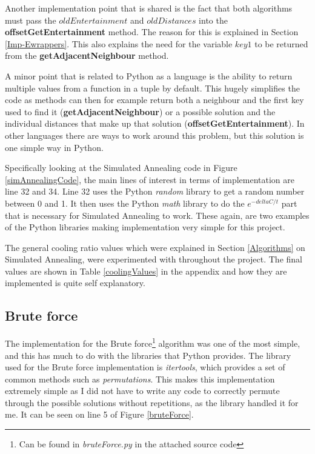 \documentclass[12pt]{report}
\begin{document}
Another implementation point that is shared is the fact that both algorithms must pass the $oldEntertainment$ and $oldDistances$ into the \textbf{offsetGetEntertainment} method. The reason for this is explained in Section \ref{Imp-Ewrappers}. This also explains the need for the variable $key1$ to be returned from the \textbf{getAdjacentNeighbour} method. 

A minor point that is related to Python as a language is the ability to return multiple values from a function in a tuple by default. This hugely simplifies the code as methods can then for example return both a neighbour and the first key used to find it (\textbf{getAdjacentNeighbour}) or a possible solution and the individual distances that make up that solution (\textbf{offsetGetEntertainment}). In other languages there are ways to work around this problem, but this solution is one simple way in Python.

Specifically looking at the Simulated Annealing code in Figure \ref{simAnnealingCode}, the main lines of interest in terms of implementation are line 32 and 34. Line 32 uses the Python \textit{random}\cite{PythonRandom} library to get a random number between 0 and 1. It then uses the Python \textit{math}\cite{PythonMath} library to do the $e^{-deltaC/t}$ part that is necessary for Simulated Annealing to work. These again, are two examples of the Python libraries making implementation very simple for this project.

The general cooling ratio values which were explained in Section \ref{Algorithms} on Simulated Annealing, were experimented with throughout the project. The final values are shown in Table \ref{coolingValues} in the appendix and how they are implemented is quite self explanatory.

\subsection{Brute force}\label{Imp-Brute}
The implementation for the Brute force\footnote{Can be found in \textit{bruteForce.py} in the attached source code} algorithm was one of the most simple, and this has much to do with the libraries that Python provides. The library used for the Brute force implementation is \textit{itertools}\cite{PythonItertools}, which provides a set of common methods such as \textit{permutations}\cite{PythonPermutations}. This makes this implementation extremely simple as I did not have to write any code to correctly permute through the possible solutions without repetitions, as the library handled it for me. It can be seen on line 5 of Figure \ref{bruteForce}.
\end{document}
